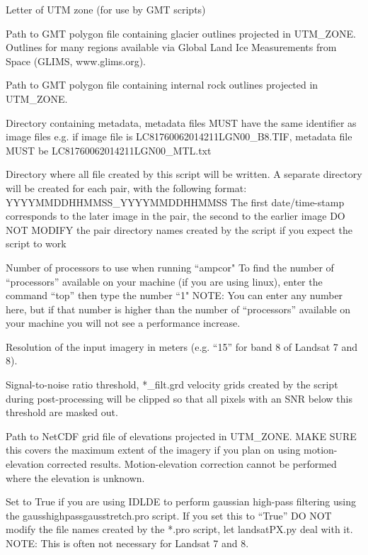 \documentclass[12pt]{article}
\begin{document}
 Letter of UTM zone (for use by GMT scripts)

 Path to GMT polygon file containing glacier outlines projected in UTM\_ZONE.
Outlines for many regions available via Global Land Ice Measurements from Space (GLIMS, www.glims.org).

 Path to GMT polygon file containing internal rock outlines projected in UTM\_ZONE.

 Directory containing metadata, metadata files MUST have the same identifier as image files
e.g. if image file is LC81760062014211LGN00\_B8.TIF, metadata file MUST be LC81760062014211LGN00\_MTL.txt

 Directory where all file created by this script will be written.
A separate directory will be created for each pair, with the following format: YYYYMMDDHHMMSS\_YYYYMMDDHHMMSS
The first date/time-stamp corresponds to the later image in the pair, the second to the earlier image
DO NOT MODIFY the pair directory names created by the script if you expect the script to work

 Number of processors to use when running ``ampcor"
To find the number of ``processors'' available on your machine (if you are using linux), enter the command ``top'' then type the number ``1"
NOTE: You can enter any number here, but if that number is higher than the number of ``processors'' available on your machine you will not see a performance increase.

 Resolution of the input imagery in meters (e.g. ``15'' for band 8 of Landsat 7 and 8).

 Signal-to-noise ratio threshold, *\_filt.grd velocity grids created by the script during post-processing will be clipped so that all pixels
with an SNR below this threshold are masked out.

 Path to NetCDF grid file of elevations projected in UTM\_ZONE.
MAKE SURE this covers the maximum extent of the imagery if you plan on using motion-elevation corrected results.
Motion-elevation correction cannot be performed where the elevation is unknown.

 Set to True if you are using IDLDE to perform gaussian high-pass filtering using the gausshighpassgausstretch.pro script.
If you set this to ``True'' DO NOT modify the file names created by the *.pro script, let landsatPX.py deal with it.
NOTE: This is often not necessary for Landsat 7 and 8.
\end{document}
